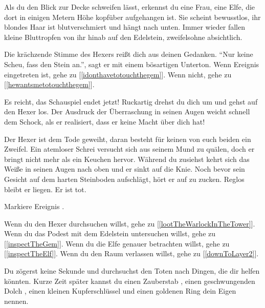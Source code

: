 Als du den Blick zur Decke schweifen lässt, erkennst du eine Frau, eine Elfe, die dort in einigen Metern Höhe kopfüber aufgehangen ist. Sie scheint bewusstlos, ihr blondes Haar ist blutverschmiert und hängt nach unten. Immer wieder fallen kleine Bluttropfen von ihr hinab auf den Edelstein, zweifelsohne absichtlich.

Die krächzende Stimme des Hexers reißt dich aus deinen Gedanken. ``Nur keine Scheu, fass den Stein an.'', sagt er mit einem bösartigen Unterton.
Wenn Ereignis  eingetreten ist, gehe zu [\ref{idonthavetotouchthegem}]. Wenn nicht, gehe zu [\ref{hewantsmetotouchthegem}].


Es reicht, das Schauspiel endet jetzt! Ruckartig drehst du dich um und gehst auf den Hexer los. Der Ausdruck der Überraschung in seinen Augen weicht schnell dem Schock, als er realisiert, dass er keine Macht über dich hat!



Der Hexer ist dem Tode geweiht, daran besteht für keinen von euch beiden ein Zweifel. Ein atemloser Schrei versucht sich aus seinem Mund zu quälen, doch er bringt nicht mehr als ein Keuchen hervor. Während du zusiehst kehrt sich das Weiße in seinen Augen nach oben und er sinkt auf die Knie. Noch bevor sein Gesicht auf dem harten Steinboden aufschlägt, hört er auf zu zucken. Reglos bleibt er liegen. Er ist tot.

Markiere Ereignis .

Wenn du den Hexer durchsuchen willst, gehe zu [\ref{lootTheWarlockInTheTower}].
Wenn du das Podest mit dem Edelstein untersuchen willst, gehe zu [\ref{inspectTheGem}].
Wenn du die Elfe genauer betrachten willst, gehe zu [\ref{inspectTheElf}].
Wenn du den Raum verlassen willst, gehe zu [\ref{downToLayer2}].


Du zögerst keine Sekunde und durchsuchst den Toten nach Dingen, die dir helfen könnten.
Kurze Zeit später kannst du einen Zauberstab , einen geschwungenden Dolch , einen kleinen Kupferschlüssel  und einen goldenen Ring  dein Eigen nennen.

